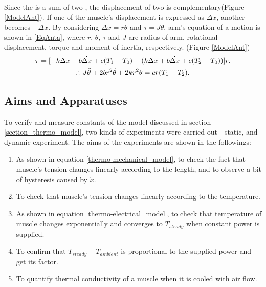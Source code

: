 Since the \anta is a sum of two \scpsnospace, the displacement of two \scps is complementary(Figure \ref{ModelAnt}). If one of the muscle's displacement is expressed as $\Delta{x}$, another becomes $-\Delta{x}$. By considering $\Delta{x}=r\theta$ and $\tau=J\ddot{\theta}$, arm's equation of a motion is shown in \eqref{EqAnta}, where $r$, $\theta$, $\tau$ and $J$ are radius of arm, rotational displacement, torque and moment of inertia, respectively.
(Figure \ref{ModelAnt})
\begin{gather}
\tau = [-k\Delta x-b\dot{\Delta x}+c(T_1-T_0) - (k\Delta x+b\dot{\Delta x}+c(T_2-T_0))]r. \notag \\
\therefore J\ddot{\theta}+2br^2\dot{\theta}+2kr^2\theta = cr(T_1-T_2). \label{EqAnta}
\end{gather}

\subsection{Aims and Apparatuses}\label{section_aimsappa}
To verify and measure constants of the model discussed in section \ref{section_thermo_model}, two kinds of experiments were carried out - static, and dynamic experiment. The aims of the experiments are shown in the followings:

\begin{enumerate} 
\item As shown in equation \eqref{thermo-mechanical_model}, to check the fact that muscle's tension changes linearly according to the length, and to observe a bit of hysteresis caused by $\dot{x}$.
\item To check that muscle's tension changes linearly according to the temperature.
\item As shown in equation \eqref{thermo-electrical_model}, to check that temperature of muscle changes exponentially and converges to $T_{steady}$ when constant power is supplied.
\item To confirm that $T_{steady}-T_{ambient}$ is proportional to the supplied power and get its factor. 
\item To quantify thermal conductivity of a muscle when it is cooled with air flow.
\end{enumerate}

